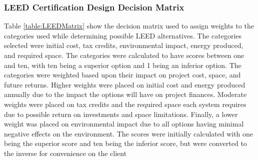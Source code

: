 \documentclass{ceri}
\begin{document}
\subsubsection{LEED Certification Design Decision Matrix}
Table \ref{table:LEEDMatrix} show the decision matrix used to assign weights to the categories used while determining possible LEED alternatives. The categories selected were initial cost, tax credits, environmental impact, energy produced, and required space. The categories were calculated to have scores between one and ten, with ten being a superior option and 1 being an inferior option. The categories were weighted based upon their impact on project cost, space, and future returns. Higher weights were placed on initial cost and energy produced annually due to the impact the options will have on project finances. Moderate weights were placed on tax credits and the required space each system requires due to possible return on investments and space limitations. Finally, a lower weight was placed on environmental impact due to all options having minimal negative effects on the environment. The scores were initially calculated with one being the superior score and ten being the inferior score, but were converted to the inverse for convenience on the client

\begin{table}[H]
\centering
\caption{LEED Certification Category Comparison}
\label{my-label}
\end{table}
\end{document}
